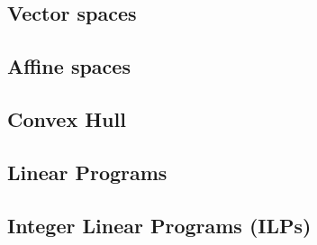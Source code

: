 \subsection{Vector spaces}

\subsection{Affine spaces}

\subsection{Convex Hull}

\subsection{Linear Programs}

\subsection{Integer Linear Programs (ILPs)}
